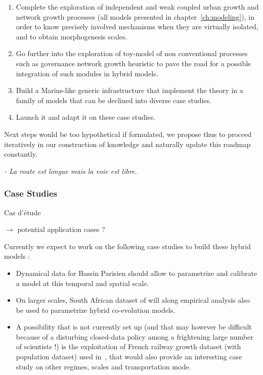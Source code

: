 \begin{enumerate}
\item Complete the exploration of independent and weak coupled urban growth and network growth processes (all models presented in chapter~\ref{ch:modeling}), in order to know precisely involved mechanisms when they are virtually isolated, and to obtain morphogenesis scales.
\item Go further into the exploration of toy-model of non conventional processes such as governance network growth heuristic to pave the road for a possible integration of such modules in hybrid models.
\item Build a Marius-like generic infrastructure that implement the theory in a family of models that can be declined into diverse case studies.
\item Launch it and adapt it on these case studies.
\end{enumerate}

Next steps would be too hypothetical if formulated, we propose thus to proceed iteratively in our construction of knowledge and naturally update this roadmap constantly.

\bigskip
\bigskip
\bigskip

\textit{ - La route est longue mais la voie est libre.}



\subsubsection*{Case Studies}{Cas d'étude}

$\rightarrow$ potential application cases ?

Currently we expect to work on the following case studies to build these hybrid models :

\begin{itemize}
\item Dynamical data for Bassin Parisien should allow to parametrize and calibrate a model at this temporal and spatial scale.
\item On larger scales, South African dataset of  will along empirical analysis also be used to parametrize hybrid co-evolution models.
\item A possibility that is not currently set up (and that may however be difficult because of a disturbing closed-data policy among a frightening large number of scientists !) is the exploitation of French railway growth dataset (with population dataset) used in~\cite{bretagnolle:tel-00459720}, that would also provide an interesting case study on other regimes, scales and transportation mode.
\end{itemize}






